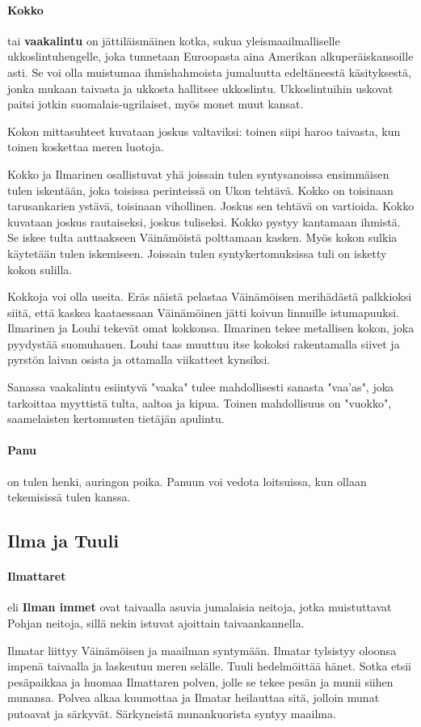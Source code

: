   \paragraph{Kokko} tai \textbf{vaakalintu} on jättiläismäinen kotka, sukua yleismaailmalliselle
    ukkos\-lintuhengelle, joka tunnetaan Euroopasta aina Amerikan alkuperäiskansoille asti. Se
    voi olla muistumaa ihmishahmoista jumaluutta edeltäneestä käsityksestä, jonka mukaan taivasta
    ja ukkosta hallitsee ukkoslintu. Ukkoslintuihin uskovat paitsi jotkin suomalais-ugrilaiset,
    myös monet muut kansat. \par
    Kokon mittasuhteet kuvataan joskus valtaviksi: toinen siipi haroo taivasta, kun toinen
    koskettaa meren luotoja. \par
    Kokko ja Ilmarinen osallistuvat yhä joissain tulen syntysanoissa ensimmäisen tulen iskentään,
    joka toisissa perinteissä on Ukon tehtävä. Kokko on toisinaan tarusankarien ystävä, toisinaan
    vihollinen. Joskus sen tehtävä on vartioida. Kokko kuvataan joskus rautaiseksi, joskus
    tuliseksi. Kokko pystyy kantamaan ihmistä. Se iskee tulta auttaakseen Väinämöistä polttamaan
    kasken. Myös kokon sulkia käytetään tulen iskemiseen. Joissain tulen syntykertomuksissa tuli
    on isketty kokon sulilla. \par
    Kokkoja voi olla useita. Eräs näistä pelastaa Väinämöisen merihädästä palkkioksi siitä, että
    kaskea kaataessaan Väinämöinen jätti koivun linnuille istumapuuksi. Ilmarinen ja Louhi tekevät
    omat kokkonsa. Ilmarinen tekee metallisen kokon, joka pyydystää suomuhauen. Louhi taas muuttuu
    itse kokoksi rakentamalla siivet ja pyrstön laivan osista ja ottamalla viikatteet
    kynsiksi. \par
    Sanassa vaakalintu esiintyvä "vaaka" tulee mahdollisesti sanasta "vaa’as", joka tarkoittaa
    myyttistä tulta, aaltoa ja kipua. Toinen mahdollisuus on "vuokko", saamelaisten kertomusten
    tietäjän apulintu.
  \paragraph{Panu} on tulen henki, auringon poika. Panuun voi vedota loitsuissa, kun ollaan
    tekemisissä tulen kanssa.


\subsection{Ilma ja Tuuli}

  \paragraph{Ilmattaret} eli \textbf{Ilman immet} ovat taivaalla asuvia jumalaisia neitoja, jotka
    muistuttavat Pohjan neitoja, sillä nekin istuvat ajoittain taivaankannella. \par
    Ilmatar liittyy Väinämöisen ja maailman syntymään. Ilmatar tylsistyy oloonsa impenä taivaalla
    ja laskeutuu meren selälle. Tuuli hedelmöittää hänet. Sotka etsii pesäpaikkaa ja huomaa
    Ilmattaren polven, jolle se tekee pesän ja munii siihen munansa. Polvea alkaa kuumottaa ja
    Ilmatar heilauttaa sitä, jolloin munat putoavat ja särkyvät. Särkyneistä munankuorista syntyy
    maailma.
